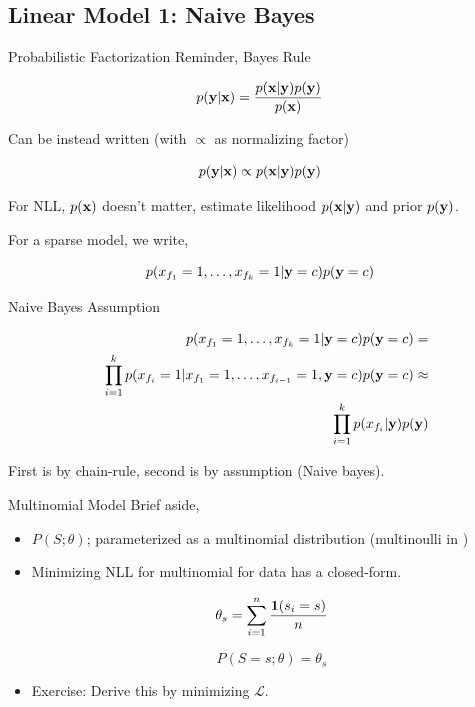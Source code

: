\documentclass{beamer}
\begin{document}
\subsection{Linear Model 1: Naive Bayes}

\begin{frame}{Probabilistic Factorization} 
  Reminder, Bayes Rule

  \[ p(\mathbf{y} | \mathbf{x}) = \frac{p(\mathbf{x} | \mathbf{y}) p(\mathbf{y})}{p(\mathbf{x})} \] 

  Can be instead written (with $\propto$ as normalizing factor) 

  \[ p(\mathbf{y} | \mathbf{x}) \propto p(\mathbf{x} | \mathbf{y}) p(\mathbf{y}) \] 


  For NLL, $p(\mathbf{x})$ doesn't matter, estimate likelihood $p(\mathbf{x} | \mathbf{y})$ and
  prior $p(\mathbf{y})$.


  \air

  For a sparse model, we write, 
  
  \[p(x_{f_1}=1, \ldots, x_{f_k}=1 | \mathbf{y}=c ) p(\mathbf{y}=c)\]



\end{frame}


\begin{frame}{Naive Bayes Assumption} 

  \begin{eqnarray*}
    && p(x_{f_1}=1, \ldots, x_{f_k}=1 | \mathbf{y}=c ) p(\mathbf{y}=c) =\\
     && \prod_{i=1}^k p(x_{f_i}=1 | x_{f_1}=1, \ldots, x_{f_{i-1}}=1, \mathbf{y}=c) p(\mathbf{y}=c) \approx \\
     && \prod_{i=1}^k p(x_{f_i} | \mathbf{y}) p(\mathbf{y})  
  \end{eqnarray*}

  
  First is by chain-rule, second is by assumption (Naive bayes). 

\end{frame}



\begin{frame}{Multinomial Model} 
  Brief aside, 
  \begin{itemize}
  \item $P(S; \theta)$; parameterized as a multinomial distribution (multinoulli in )  

  \item Minimizing NLL for multinomial for data has a closed-form.

    \[ \theta_s = \sum_{i=1}^n \frac{\mathbf{1}(s_i = s)}{n} \]

    \[ P(S=s; \theta) = \theta_s \]

  \item Exercise: Derive this by minimizing $\mathcal{L}$. 

  \end{itemize}
\end{frame}
\end{document}
